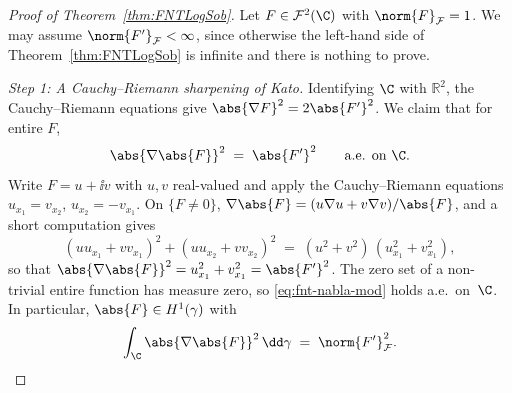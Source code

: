 \begin{proof}[Proof of Theorem~\ref{thm:FNTLogSob}]
Let $F \in \mathcal{F}^2(\C)$ with $\norm{F}_{\mathcal{F}} = 1$.
We may assume $\norm{F'}_{\mathcal{F}} < \infty$, since otherwise the
left-hand side of Theorem~\ref{thm:FNTLogSob} is infinite and there is nothing
to prove.
\medskip

\noindent
\emph{Step 1: A Cauchy--Riemann sharpening of Kato.}\;
Identifying $\C$ with $\mathbb{R}^2$, the Cauchy--Riemann equations
give $\abs{\nabla F}^2 = 2 \abs{F'}^2$.  We claim that for
entire $F$,
\begin{equation}\label{eq:fnt-nabla-mod}
\abs{\nabla \abs{F}}^2
\;=\; \abs{F'}^2 \qquad \text{a.e. on } \C.
\end{equation}
Write $F = u + \ii v$ with $u, v$ real-valued and apply the Cauchy--Riemann
equations $u_{x_1} = v_{x_2}$, $u_{x_2} = -v_{x_1}$.  On $\{F \neq 0\}$,
$\nabla \abs{F} = (u \nabla u + v \nabla v) / \abs{F}$, and a
short computation gives
\[
(u u_{x_1} + v v_{x_1})^2
+ (u u_{x_2} + v v_{x_2})^2
\;=\; (u^2 + v^2)\, (u_{x_1}^2 + v_{x_1}^2),
\]
so that
$\abs{\nabla \abs{F}}^2
= u_{x_1}^2 + v_{x_1}^2 = \abs{F'}^2$.
The zero set of a non-trivial entire function has measure zero, so
\eqref{eq:fnt-nabla-mod} holds a.e.\ on~$\C$.  In particular,
$\abs{F} \in H^1(\gamma)$ with
\begin{equation}\label{eq:fnt-mod-energy}
\int_{\C} \abs{\nabla \abs{F}}^2\, \dd\gamma
\;=\; \norm{F'}_{\mathcal{F}}^2.
\end{equation}


\end{proof}
